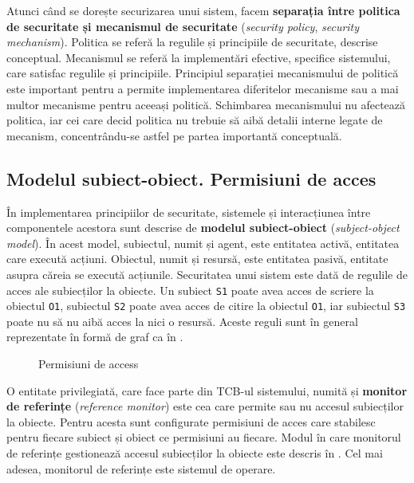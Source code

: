 Atunci când se dorește securizarea unui sistem, facem \textbf{separația între politica de securitate și mecanismul de securitate} (\textit{security policy}, \textit{security mechanism}). Politica se referă la regulile și principiile de securitate, descrise conceptual. Mecanismul se referă la implementări efective, specifice sistemului, care satisfac regulile și principiile. Principiul separației mecanismului de politică este important pentru a permite implementarea diferitelor mecanisme sau a mai multor mecanisme pentru aceeași politică. Schimbarea mecanismului nu afectează politica, iar cei care decid politica nu trebuie să aibă detalii interne legate de mecanism, concentrându-se astfel pe partea importantă conceptuală.

\subsection{Modelul subiect-obiect. Permisiuni de acces}
\label{sec:sec:fundamentals:permissions}

În implementarea principiilor de securitate, sistemele și interacțiunea între componentele acestora sunt descrise de \textbf{modelul subiect-obiect} (\textit{subject-object model}). În acest model, subiectul, numit și agent, este entitatea activă, entitatea care execută acțiuni. Obiectul, numit și resursă, este entitatea pasivă, entitate asupra căreia se execută acțiunile. Securitatea unui sistem este dată de regulile de acces ale subiecților la obiecte. Un subiect \texttt{S1} poate avea acces de scriere la obiectul \texttt{O1}, subiectul \texttt{S2} poate avea acces de citire la obiectul \texttt{O1}, iar subiectul \texttt{S3} poate nu să nu aibă acces la nici o resursă. Aceste reguli sunt în general reprezentate în formă de graf ca în .

\begin{figure}[htbp]
  \centering
  \def\svgwidth{\columnwidth}
  
  \caption{Permisiuni de access}
  \label{fig:sec:access-permissions}
\end{figure}

O entitate privilegiată, care face parte din TCB-ul sistemului, numită și \textbf{monitor de referințe} (\textit{reference monitor}) este cea care permite sau nu accesul subiecților la obiecte. Pentru acesta sunt configurate permisiuni de acces care stabilesc pentru fiecare subiect și obiect ce permisiuni au fiecare. Modul în care monitorul de referințe gestionează accesul subiecților la obiecte este descris în . Cel mai adesea, monitorul de referințe este sistemul de operare.

